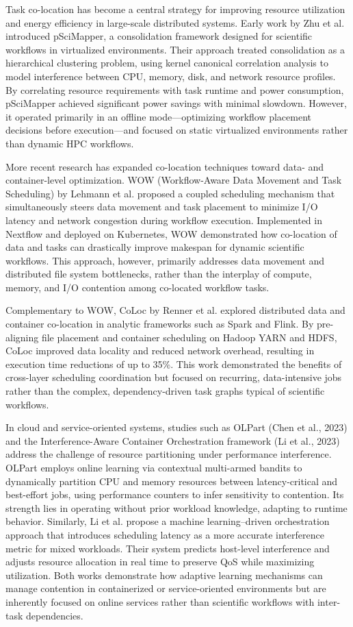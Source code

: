 Task co-location has become a central strategy for improving resource utilization and energy efficiency in large-scale distributed systems. Early work by Zhu et al. introduced pSciMapper, a consolidation framework designed for scientific workflows in virtualized environments. Their approach treated consolidation as a hierarchical clustering problem, using kernel canonical correlation analysis to model interference between CPU, memory, disk, and network resource profiles. By correlating resource requirements with task runtime and power consumption, pSciMapper achieved significant power savings with minimal slowdown. However, it operated primarily in an offline mode—optimizing workflow placement decisions before execution—and focused on static virtualized environments rather than dynamic HPC workflows.

More recent research has expanded co-location techniques toward data- and container-level optimization. WOW (Workflow-Aware Data Movement and Task Scheduling) by Lehmann et al. proposed a coupled scheduling mechanism that simultaneously steers data movement and task placement to minimize I/O latency and network congestion during workflow execution. Implemented in Nextflow and deployed on Kubernetes, WOW demonstrated how co-location of data and tasks can drastically improve makespan for dynamic scientific workflows. This approach, however, primarily addresses data movement and distributed file system bottlenecks, rather than the interplay of compute, memory, and I/O contention among co-located workflow tasks.

Complementary to WOW, CoLoc by Renner et al. explored distributed data and container co-location in analytic frameworks such as Spark and Flink. By pre-aligning file placement and container scheduling on Hadoop YARN and HDFS, CoLoc improved data locality and reduced network overhead, resulting in execution time reductions of up to 35\%. This work demonstrated the benefits of cross-layer scheduling coordination but focused on recurring, data-intensive jobs rather than the complex, dependency-driven task graphs typical of scientific workflows.

 In cloud and service-oriented systems, studies such as OLPart (Chen et al., 2023) and the Interference-Aware Container Orchestration framework (Li et al., 2023) address the challenge of resource partitioning under performance interference. OLPart employs online learning via contextual multi-armed bandits to dynamically partition CPU and memory resources between latency-critical and best-effort jobs, using performance counters to infer sensitivity to contention. Its strength lies in operating without prior workload knowledge, adapting to runtime behavior. Similarly, Li et al. propose a machine learning–driven orchestration approach that introduces scheduling latency as a more accurate interference metric for mixed workloads. Their system predicts host-level interference and adjusts resource allocation in real time to preserve QoS while maximizing utilization. Both works demonstrate how adaptive learning mechanisms can manage contention in containerized or service-oriented environments but are inherently focused on online services rather than scientific workflows with inter-task dependencies.

